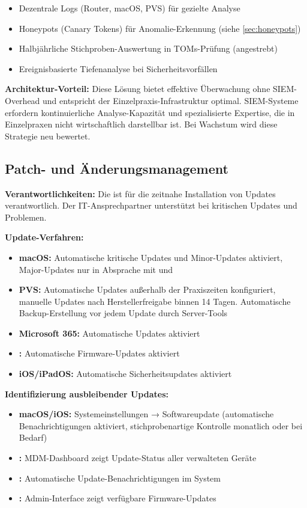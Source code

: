 \begin{itemize}
  \item Dezentrale Logs (Router, macOS, PVS) für gezielte Analyse
  \item Honeypots (Canary Tokens) für Anomalie-Erkennung (siehe \cref{sec:honeypots})
  \item Halbjährliche Stichproben-Auswertung in TOMs-Prüfung (angestrebt)
  \item Ereignisbasierte Tiefenanalyse bei Sicherheitsvorfällen
\end{itemize}

\textbf{Architektur-Vorteil:} Diese Lösung bietet effektive Überwachung ohne
SIEM-Overhead und entspricht der Einzelpraxis-Infrastruktur optimal.
SIEM-Systeme erfordern kontinuierliche Analyse-Kapazität und spezialisierte
Expertise, die in Einzelpraxen nicht wirtschaftlich darstellbar ist.
Bei Wachstum wird diese Strategie neu bewertet.

\subsection{Patch- und Änderungsmanagement}
\label{sec:patch}

\textbf{Verantwortlichkeiten:} Die \PraxisInhaberBezeichnung{} ist für die zeitnahe Installation von
Updates verantwortlich. Der IT-Ansprechpartner unterstützt bei kritischen Updates und Problemen.

\textbf{Update-Verfahren:}
\begin{itemize}
  \item \textbf{macOS:} Automatische kritische Updates und Minor-Updates aktiviert, Major-Updates nur in Absprache mit \PVSName{} und \PraxisInhaberBezeichnung{}
  \item \textbf{\PVSName{} PVS:} Automatische Updates außerhalb der Praxiszeiten konfiguriert, manuelle Updates nach Herstellerfreigabe binnen 14 Tagen. Automatische Backup-Erstellung vor jedem Update durch Server-Tools
  \item \textbf{Microsoft 365:} Automatische Updates aktiviert
  \item \textbf{\RouterKurz{}:} Automatische Firmware-Updates aktiviert
  \item \textbf{iOS/iPadOS:} Automatische Sicherheitsupdates aktiviert
\end{itemize}

\textbf{Identifizierung ausbleibender Updates:}
\begin{itemize}
  \item \textbf{macOS/iOS:} Systemeinstellungen → Softwareupdate (automatische Benachrichtigungen 
aktiviert, stichprobenartige Kontrolle monatlich oder bei Bedarf)
  \item \textbf{\MDMTool{}:} MDM-Dashboard zeigt Update-Status aller verwalteten Geräte
  \item \textbf{\PVSName{}:} Automatische Update-Benachrichtigungen im System
  \item \textbf{\RouterKurz{}:} Admin-Interface zeigt verfügbare Firmware-Updates
\end{itemize}

